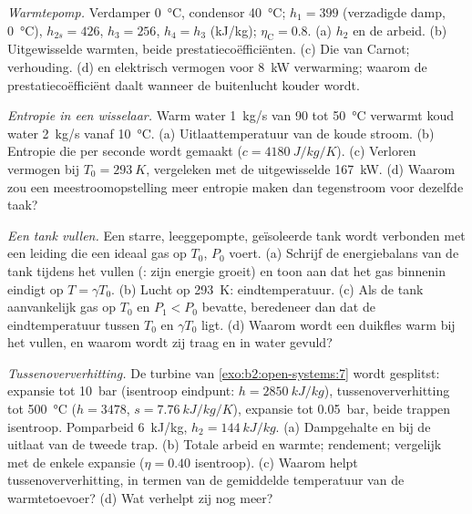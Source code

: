 \begin{exercise}[$\star\star$]\label{exo:b2:open-systems:8}
\emph{Warmtepomp.} Verdamper \qty{0}{\celsius}, condensor \qty{40}{\celsius};
$h_1 = 399$ (verzadigde damp, \qty{0}{\celsius}), $h_{2s} = 426$, $h_3 = 256$,
$h_4 = h_3$ (\unit{kJ/kg}); $\eta_{\text{C}} = 0.8$. (a) $h_2$ en de arbeid.
(b) Uitgewisselde warmten, beide prestatiecoëfficiënten. (c) Die van Carnot;
verhouding. (d) 
en elektrisch vermogen voor \qty{8}{kW} verwarming; waarom de
prestatiecoëfficiënt daalt wanneer
de buitenlucht kouder wordt.
\end{exercise}

\begin{exercise}[$\star\star$]\label{exo:b2:open-systems:9}
\emph{Entropie in een wisselaar.} Warm water \qty{1}{kg/s} van \qty{90}{} tot
\qty{50}{\celsius} verwarmt koud water \qty{2}{kg/s} vanaf \qty{10}{\celsius}.
(a) Uitlaattemperatuur van de koude stroom. (b) Entropie die per
seconde wordt gemaakt ($c = \qty{4180}{J/kg/K}$). (c) Verloren vermogen bij
$T_0 = \qty{293}{K}$,
vergeleken met de uitgewisselde \qty{167}{kW}. (d) Waarom zou een
meestroomopstelling
meer entropie maken dan tegenstroom voor dezelfde taak?
\end{exercise}

\begin{exercise}[$\star\star\star$]\label{exo:b2:open-systems:10}
\emph{Een tank vullen.} Een starre, leeggepompte, geïsoleerde tank wordt verbonden
met een leiding die een ideaal gas op $T_0$, $P_0$ voert. (a) Schrijf de
energie\-balans
van de tank tijdens het vullen (: zijn energie groeit) en
toon aan dat het gas binnenin eindigt op $T = \gamma T_0$. (b) Lucht op
\qty{293}{K}:
eindtemperatuur. (c) Als de tank aanvankelijk gas op $T_0$ en
$P_1 < P_0$ bevatte, beredeneer dan dat de eindtemperatuur tussen $T_0$ en
$\gamma T_0$ ligt. (d) Waarom wordt een duikfles warm bij het vullen, en waarom
wordt zij traag en in water gevuld?
\end{exercise}

\begin{exercise}[$\star\star\star$]\label{exo:b2:open-systems:11}
\emph{Tussenoververhitting.} De turbine van \cref{exo:b2:open-systems:7}
wordt gesplitst:
expansie tot \qty{10}{bar} (isentroop eindpunt: $h = \qty{2850}{kJ/kg}$),
tussenoververhitting
tot \qty{500}{\celsius} ($h = 3478$, $s = \qty{7.76}{kJ/kg/K}$), expansie tot
\qty{0.05}{bar}, beide trappen isentroop. Pomparbeid \qty{6}{kJ/kg},
$h_2 =
\qty{144}{kJ/kg}$. (a) Dampgehalte en  bij de uitlaat van de
tweede trap. (b)
Totale arbeid en warmte; rendement; vergelijk met de enkele expansie
($\eta = 0.40$ isentroop). (c) Waarom helpt tussenoververhitting, in termen van de
gemiddelde temperatuur van de warmtetoevoer? (d) Wat verhelpt zij nog meer?
\end{exercise}

